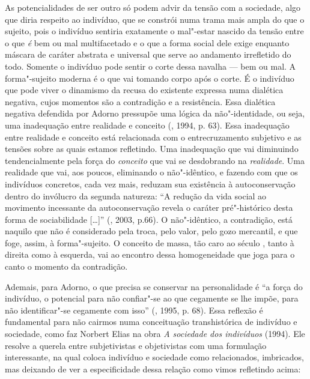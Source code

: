 As potencialidades de ser outro só podem advir da tensão com a
sociedade, algo que diria respeito ao indivíduo, que se constrói numa
trama mais ampla do que o sujeito, pois o indivíduo sentiria exatamente
o mal"-estar nascido da tensão entre o que \emph{é} bem ou mal
multifacetado e o que a forma social dele exige enquanto máscara de
caráter abstrata e universal que serve ao andamento irrefletido do todo.
Somente o indivíduo pode sentir o corte dessa navalha --- bem ou mal. A
forma"-sujeito moderna é o que vai tomando corpo após o corte. É o
indivíduo que pode viver o dinamismo da recusa do existente expressa
numa dialética negativa, cujos momentos são a contradição e a
resistência. Essa dialética negativa defendida por Adorno pressupõe uma
lógica da não"-identidade, ou seja, uma inadequação entre realidade e
conceito (, 1994, p. 63). Essa inadequação entre realidade e
conceito está relacionada com o entrecruzamento subjetivo e as tensões
sobre as quais estamos refletindo. Uma inadequação que vai diminuindo
tendencialmente pela força do \emph{conceito} que vai se desdobrando na
\emph{realidade}. Uma realidade que vai, aos poucos, eliminando o
não"-idêntico, e fazendo com que os indivíduos concretos, cada vez mais,
reduzam sua existência à autoconservação dentro do invólucro da segunda
natureza: ``A redução da vida social ao movimento incessante da
autoconservação revela o caráter pré"-histórico desta forma de
sociabilidade [\ldots{}]'' (, 2003, p.66). O não"-idêntico, a
contradição, está naquilo que não é considerado pela troca, pelo valor,
pelo gozo mercantil, e que foge, assim, à forma"-sujeito. O conceito de
massa, tão caro ao século , tanto à direita como à esquerda, vai ao
encontro dessa homogeneidade que joga para o canto o momento da
contradição.

Ademais, para Adorno, o que precisa se conservar na personalidade é ``a
força do indivíduo, o potencial para não confiar"-se ao que cegamente se
lhe impõe, para não identificar"-se cegamente com isso'' (, 1995, p. 68). Essa reflexão é fundamental para não cairmos numa conceituação
transhistórica de indivíduo e sociedade, como faz Norbert Elias na obra
\emph{A sociedade dos indivíduos} (1994). Ele resolve a querela entre
subjetivistas e objetivistas com uma formulação interessante, na qual
coloca indivíduo e sociedade como relacionados, imbricados, mas deixando
de ver a especificidade dessa relação como vimos refletindo acima:

